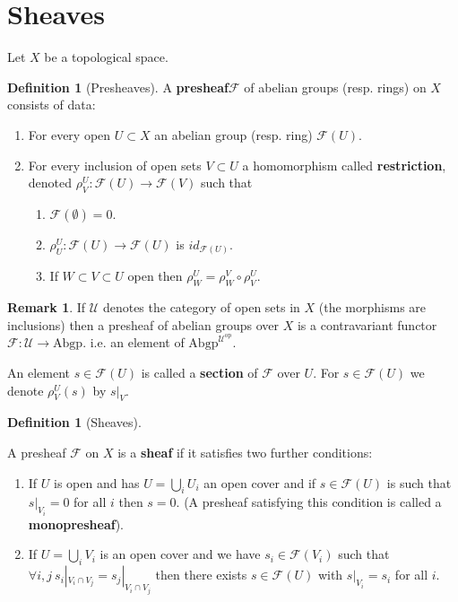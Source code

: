 \documentclass[10pt,]{book}
\newcommand{\terminology}[1]{\textbf{#1}}
\theoremstyle{plain}
\theoremstyle{definition}
\newtheorem{definition}[theorem]{Definition}
\newtheorem{remark}[theorem]{Remark}
\newcommand{\id}{id}
\newcommand{\F}{\mathcal{F}}
\newcommand{\U}{\mathcal{U}}
\begin{document}
\section[Sheaves]{Sheaves}\label{sec-sheaves}
Let \(X\) be a topological space.%
\begin{definition}[Presheaves]\label{definition-1}
A \terminology{presheaf}\(\F\) of abelian groups (resp. rings) on \(X\) consists of data:
            \begin{enumerate}
\item{}For every open \(U \subset X\) an abelian group (resp. ring) \(\F(U)\).\item{}For every inclusion of open sets \(V\subset U\) a homomorphism called \terminology{restriction}, denoted \(\rho^U_V\colon \F(U) \to \F(V)\) such that
                \begin{enumerate}
\item{}\(\F(\emptyset) = 0.\)\item{}\(\rho^U_U\colon \F(U) \to \F(U)\) is \(\id_{\F(U)}\).\item{}If \(W \subset V \subset U\) open then \(\rho^U_W = \rho^V_W \circ \rho^U_V\).\end{enumerate}

              \end{enumerate}
\end{definition}
\begin{remark}\label{remark-1}
If \(\U\) denotes the category of open sets in \(X\) (the morphisms are inclusions) then a presheaf of abelian groups over \(X\) is a contravariant functor \(\F\colon  \U \to \text{Abgp}.\)
          i.e. an element of \(\text{Abgp}^{\U^\text{op}}\).
          \end{remark}
\par
An element \(s \in \F(U)\) is called a \terminology{section} of \(\F\) over \(U\).
          For \(s\in \F(U)\) we denote \(\rho^U_V(s)\) by \(s|_V\).
\begin{definition}[Sheaves]\label{definition-2}

            A presheaf \(\F\) on \(X\) is a \terminology{sheaf} if it satisfies two further conditions:
            \begin{enumerate}
\item{}If \(U\) is open and has \(U = \bigcup_i U_i\) an open cover and if \(s \in \F(U)\) is such that \(s|_{V_i} = 0\) for all \(i\) then \(s = 0\).
                (A presheaf satisfying this condition is called a \terminology{monopresheaf}).
              \item{}If \(U = \bigcup_i V_i\) is an open cover and we have \(s_i\in \F(V_i)\) such that \(\forall i,j\ s_i|_{V_i\cap V_j} = s_j|_{V_i\cap V_j}\) then there exists \(s \in \F(U)\) with \(s|_{V_i} = s_i\) for all \(i\).\end{enumerate}
\end{definition}
\end{document}
